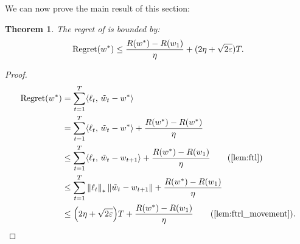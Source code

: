 \documentclass[10pt]{article}
\newtheorem{theorem}{Theorem}
\theoremstyle{definition}
\theoremstyle{remark}
\renewcommand{\epsilon}{\varepsilon}
\newcommand\inprod[2]{\langle #1,\,#2 \rangle}
\newcommand{\roundy}[1]{ {\left( #1 \right)}}
\newcommand{\reg}{{\rm Regret}}
\begin{document}
We can now prove the main result of this section:

\begin{theorem}
The regret of  is bounded by:
\begin{align*}
    \reg(w^*) \le \frac{R(w^*) - R(w_1)}{\eta} + (2\eta + \sqrt{2\epsilon}) T
    .
\end{align*}
\end{theorem}

\begin{proof}
\begin{align*}
    \reg(w^*) &= \sum_{t=1}^T\inprod{\ell_t}{\tilde{w}_t - w^*}\\
    &= \sum_{t=1}^T\inprod{\ell_t}{\tilde{w}_t - w^*} + \frac{R(w^*) - R(w^*)}{\eta} \\
    &\le \sum_{t=1}^T\inprod{\ell_t}{\tilde{w}_t - w_{t+1}} + \frac{R(w^*) - R(w_1)}{\eta}\tag{\Cref{lem:ftl}}\\
    &\le \sum_{t=1}^T \norm{\ell_t}_*\norm{\tilde{w}_t - w_{t+1}} + \frac{R(w^*) - R(w_1)}{\eta}\\
    &\le \roundy{2\eta + \sqrt{2\epsilon}}T + \frac{R(w^*) - R(w_1)}{\eta}\tag{\Cref{lem:ftrl_movement}}
    .
\end{align*}
\end{proof}
\end{document}
